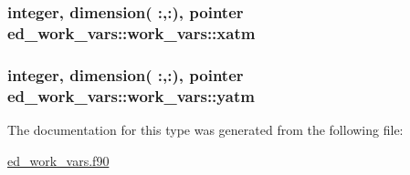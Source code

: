 \subsubsection[{xatm}]{\setlength{\rightskip}{0pt plus 5cm}integer, dimension(  \+:,\+:), pointer ed\+\_\+work\+\_\+vars\+::work\+\_\+vars\+::xatm}\label{structed__work__vars_1_1work__vars_a2dfd450e7063a25617fc8827dd11de53}
\hypertarget{structed__work__vars_1_1work__vars_a17db94cc26abac456241876d895a87b4}{}
\subsubsection[{yatm}]{\setlength{\rightskip}{0pt plus 5cm}integer, dimension(  \+:,\+:), pointer ed\+\_\+work\+\_\+vars\+::work\+\_\+vars\+::yatm}\label{structed__work__vars_1_1work__vars_a17db94cc26abac456241876d895a87b4}


The documentation for this type was generated from the following file\+:\begin{DoxyCompactItemize}
\item 
\hyperlink{ed__work__vars_8f90}{ed\+\_\+work\+\_\+vars.\+f90}\end{DoxyCompactItemize}
